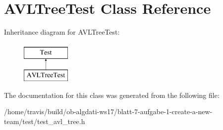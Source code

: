 \hypertarget{classAVLTreeTest}{\section{A\-V\-L\-Tree\-Test Class Reference}
\label{classAVLTreeTest}
}
Inheritance diagram for A\-V\-L\-Tree\-Test\-:\begin{figure}[H]
\begin{center}
\leavevmode
\includegraphics[height=2.000000cm]{classAVLTreeTest}
\end{center}
\end{figure}


The documentation for this class was generated from the following file\-:\begin{DoxyCompactItemize}
\item 
/home/travis/build/ob-\/algdati-\/ws17/blatt-\/7-\/aufgabe-\/1-\/create-\/a-\/new-\/team/test/test\-\_\-avl\-\_\-tree.\-h\end{DoxyCompactItemize}
